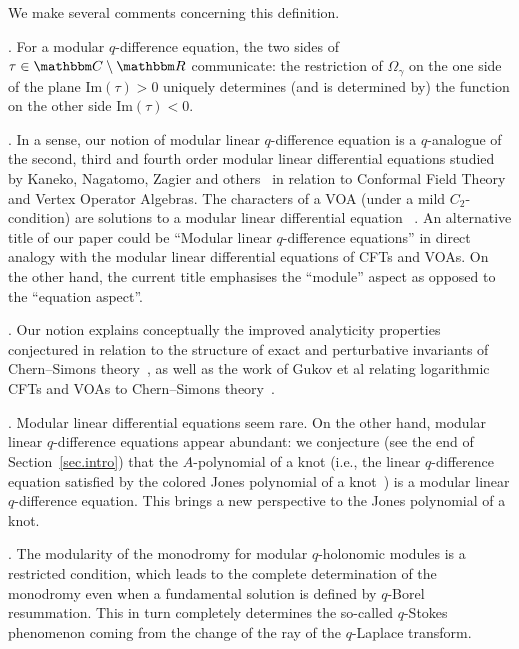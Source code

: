\documentclass[12pt,reqno]{amsart}
\theoremstyle{definition}
\def\BR{\mathbbm R}
\def\BC{\mathbbm C}
\def\Im{\mathrm{Im}}
\def\Om{\Omega}
\begin{document}
\noindent
We make several comments concerning this definition. 

. %
For a modular $q$-difference equation, the two sides of $\tau \in \BC\setminus\BR$
communicate: the restriction of $\Om_{\gamma}$ on the one side of the plane
$\Im(\tau)>0$ uniquely determines (and is determined by) the function on the
other side $\Im(\tau)<0$.

. %
In a sense, our notion of modular linear $q$-difference equation is a $q$-analogue
of the second, third and fourth order modular linear differential 
equations studied by Kaneko, Nagatomo, Zagier and others~\cite{Arike:fourth-order, 
Kaneko:third-order,Kaneko-Zagier} in relation to Conformal Field Theory 
and Vertex Operator Algebras. The characters of a VOA (under a mild $C_2$-condition)
are solutions to a modular linear differential equation
~\cite{Dong:modular-invariance,Zhu:modular-invariance}. An alternative title of
our paper could be
``Modular linear $q$-difference equations'' in direct analogy with the
modular linear differential equations of CFTs and VOAs. On the other hand, the
  current title emphasises the ``module'' aspect as opposed to the ``equation
  aspect''. 

. %
Our notion explains conceptually the improved analyticity properties conjectured
in relation to the structure of exact and perturbative invariants of Chern--Simons
theory~\cite{GGM:peacock,GGM,GGMW:trivial,GZ:qseries,GZ:kashaev}, as well as the
work of Gukov et al relating logarithmic CFTs and VOAs to Chern--Simons
theory~\cite{Cheng:VOA}. 
  
. %
Modular linear differential equations seem rare. On the other hand,
modular linear $q$-difference equations appear abundant: we conjecture
(see the end of Section~\ref{sec.intro}) that the $\hat A$-polynomial of a knot
(i.e., the linear $q$-difference equation satisfied by the colored Jones polynomial
of a knot~\cite{GL}) is a modular linear $q$-difference equation. This brings
a new perspective to the Jones polynomial of a knot.

. %
The modularity of the monodromy for modular $q$-holonomic modules is a restricted
condition, which leads to the complete determination of the monodromy even when a
fundamental solution is defined by $q$-Borel resummation. This in turn
completely determines the so-called $q$-Stokes phenomenon coming from the
change of the ray of the $q$-Laplace transform.
\end{document}
